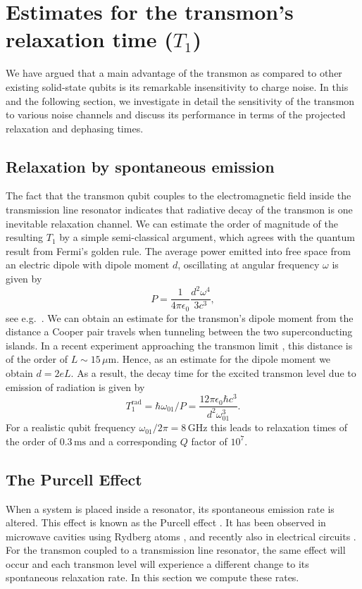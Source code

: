 \documentclass[twocolumn,amsmath,amssymb,floatfix,pra,showpacs,eqsecnum,footinbib,superscriptaddress]{revtex4}
\newcommand{\be}{\begin{equation}}
\newcommand{\ee}{\end{equation}}
\begin{document}
\section{Estimates for the transmon's relaxation time ($T_1$)\label{sec:relaxation}}
We have argued that a main advantage of the transmon as compared to other existing solid-state qubits is its remarkable insensitivity to charge noise. In this and the following section, we investigate in detail the sensitivity of the transmon to various noise channels and discuss its performance in terms of the projected relaxation and dephasing times.

\subsection{Relaxation by spontaneous emission}
The fact that the transmon qubit couples to the electromagnetic field inside the transmission line resonator indicates that radiative decay of the transmon is one inevitable relaxation channel. We can estimate the order of magnitude of the resulting $T_1$ by a simple semi-classical argument, which agrees with the quantum result from Fermi's golden rule. The average power emitted into free space from an electric dipole with dipole moment $d$, oscillating at angular frequency $\omega$ is given by
\be
P=\frac{1}{4\pi\epsilon_0}\frac{d^2\omega^4}{3c^3},
\ee
see e.g.~\cite{jackson}.
We can obtain an estimate for the transmon's dipole moment from the distance a Cooper pair travels when tunneling between the two superconducting islands. In a recent experiment approaching the transmon limit \cite{schuster}, this distance is of the order of $L\sim15\,\mu\text{m}$. Hence, as an estimate for the dipole moment we obtain $d=2eL$. 
As a result, the decay time for the excited transmon level due to emission of radiation is given by
\be
T_1^\text{rad} = \hbar\omega_{01}/P = \frac{12\pi\epsilon_0\hbar c^3}{d^2 \omega_{01}^3}.
\ee
For a realistic qubit frequency $\omega_{01}/2\pi=8\,\text{GHz}$ this leads to relaxation times of the order of $0.3\,\text{ms}$ and a corresponding $Q$ factor of $10^{7}$.

\subsection{The Purcell Effect} 
When a system is placed inside a resonator, its spontaneous emission rate is altered.  This effect is known as the Purcell effect \cite{purcell}. It has been observed in microwave cavities using Rydberg atoms \cite{goy}, and recently also in electrical circuits \cite{houck}.  For the transmon coupled to a transmission line resonator, the same effect will occur and each transmon level will experience a different change to its spontaneous relaxation rate.  In this section we compute these rates.
\end{document}
